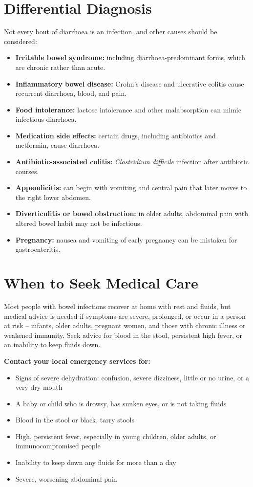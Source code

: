\section*{Differential Diagnosis}
Not every bout of diarrhoea is an infection, and other causes should be considered:
\begin{itemize}
    \item \textbf{Irritable bowel syndrome:} including diarrhoea-predominant forms, which are chronic rather than acute.
    \item \textbf{Inflammatory bowel disease:} Crohn's disease and ulcerative colitis cause recurrent diarrhoea, blood, and pain.
    \item \textbf{Food intolerance:} lactose intolerance and other malabsorption can mimic infectious diarrhoea.
    \item \textbf{Medication side effects:} certain drugs, including antibiotics and metformin, cause diarrhoea.
    \item \textbf{Antibiotic-associated colitis:} \textit{Clostridium difficile} infection after antibiotic courses.
    \item \textbf{Appendicitis:} can begin with vomiting and central pain that later moves to the right lower abdomen.
    \item \textbf{Diverticulitis or bowel obstruction:} in older adults, abdominal pain with altered bowel habit may not be infectious.
    \item \textbf{Pregnancy:} nausea and vomiting of early pregnancy can be mistaken for gastroenteritis.
\end{itemize}

\section*{When to Seek Medical Care}
Most people with bowel infections recover at home with rest and fluids, but medical advice is needed if symptoms are severe, prolonged, or occur in a person at risk -- infants, older adults, pregnant women, and those with chronic illness or weakened immunity. Seek advice for blood in the stool, persistent high fever, or an inability to keep fluids down.

\textbf{Contact your local emergency services for:}
\begin{itemize}
    \item Signs of severe dehydration: confusion, severe dizziness, little or no urine, or a very dry mouth
    \item A baby or child who is drowsy, has sunken eyes, or is not taking fluids
    \item Blood in the stool or black, tarry stools
    \item High, persistent fever, especially in young children, older adults, or immunocompromised people
    \item Inability to keep down any fluids for more than a day
    \item Severe, worsening abdominal pain
\end{itemize}

